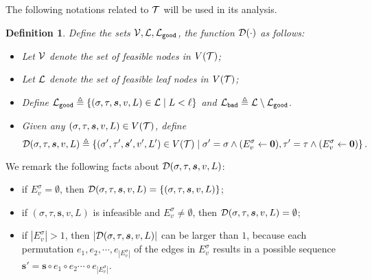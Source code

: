 \documentclass[11pt]{article}
\newtheorem{definition}[theorem]{Definition}
\newcommand{\abs}[1]{\left\vert#1\right\vert}
\newcommand{\set}[1]{\left\{#1\right\}}
\renewcommand{\mid}{\;\middle\vert\;} \newcommand{\cmid}{\,:\,}
\newcommand{\defeq}{\triangleq} \renewcommand{\d}{\,\-d}
\def\!#1{\mathtt{#1}}
\newcommand{\Par}{\!{Par}}
\newcommand{\seqS}{\boldsymbol{s}}
\newcommand{\zdtodo}[1]{\todo[color = blue!40, size = \tiny]{\textbf{zhidan:} #1}}
\newcommand{\qtodo}[1]{\todo[color = purple!40, size = \tiny]{\textbf{guoliang:} #1}}
\newcommand{\zdnew}[1]{{\color{cyan} #1}}
\begin{document}



The following notations related to $\mathcal{T}$ will be used in its analysis.
\begin{definition}\label{def-notation-v-tct}
Define the sets $\+V,\+L,\+L_{\!{good}}$, the function $\mathcal{D}(\cdot)$ as follows:
\begin{itemize}
\item Let $\mathcal{V}$ denote the set of \emph{feasible} nodes in $V(\mathcal{T})$;
\item Let $\mathcal{L}$ denote the set of \emph{feasible} leaf nodes in $V(\mathcal{T})$;
\item Define $\+L_{\!{good}}\triangleq \set{(\sigma,\tau, \seqS,v,L) \in \+L\mid L<\ell}$ and $\+L_{\!{bad}}\triangleq \+L\setminus \+L_{\!{good}}$.
\item Given any $(\sigma,\tau,\seqS,v,L)\in V(\+T)$, define 
\[
\+D(\sigma,\tau,\seqS,v,L)\triangleq \left\{(\sigma',\tau',\seqS',v',L')\in V(\+T) \mid \sigma' = \sigma \land (E^{\sigma}_v \gets \boldsymbol{0}),\tau' = \tau \land (E^{\sigma}_v \gets \boldsymbol{0})\right\}.
\]
\end{itemize}
\end{definition}
We remark the following facts about $\+D(\sigma,\tau,\seqS,v,L)$:
\begin{itemize}
\item if $E^{\sigma}_v = \emptyset$, then $\+D(\sigma,\tau,\seqS,v,L) = \{(\sigma,\tau,\seqS,v,L)\}$;
\item if $(\sigma,\tau,\seqS,v,L)$ is infeasible and $E^{\sigma}_v \neq \emptyset$, then 
$\+D(\sigma,\tau,\seqS,v,L) =\emptyset$; 
\item if $\abs{E^{\sigma}_v} > 1$, then $\abs{\+D(\sigma,\tau,\seqS,v,L)}$ can be larger than $1$, because each permutation $e_1,e_2,\cdots,e_{\abs{E^{\sigma}_v}}$ of the edges in $E^{\sigma}_v$ results in a possible sequence $\seqS' = \seqS\circ e_1 \circ e_2\cdots\circ e_{\abs{E^{\sigma}_v}}$.
\end{itemize}
\end{document}

